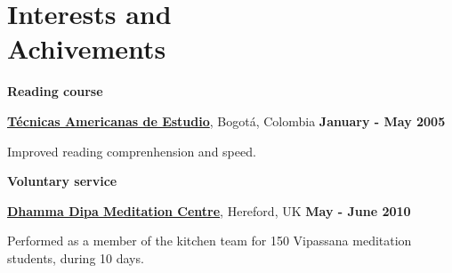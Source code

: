 %
% 
% 

% 

\section{Interests and \\ Achivements}
%
\textbf{Reading course}

\begin{outerlist}
\item[\FA \faAngleDoubleRight]
\href{http://www.tecnicasamericanas.com/}{\textbf{T\'ecnicas Americanas de Estudio}}, Bogot\'a, Colombia%
        \hfill \textbf{January - May 2005}
\end{outerlist}

\begin{innerlist}
\item Improved reading comprenhension and speed.
\end{innerlist}

\halfblankline

\textbf{Voluntary service}

\begin{outerlist}
\item[\FA \faAngleDoubleRight] \href{http://www.dipa.dhamma.org/}{\textbf{Dhamma
Dipa Meditation Centre}}, Hereford, UK%
        \hfill \textbf{May - June 2010}
\end{outerlist}

\begin{innerlist}
\item Performed as a member of the kitchen team for 150 Vipassana meditation
students, during 10 days.
\end{innerlist}

% 


